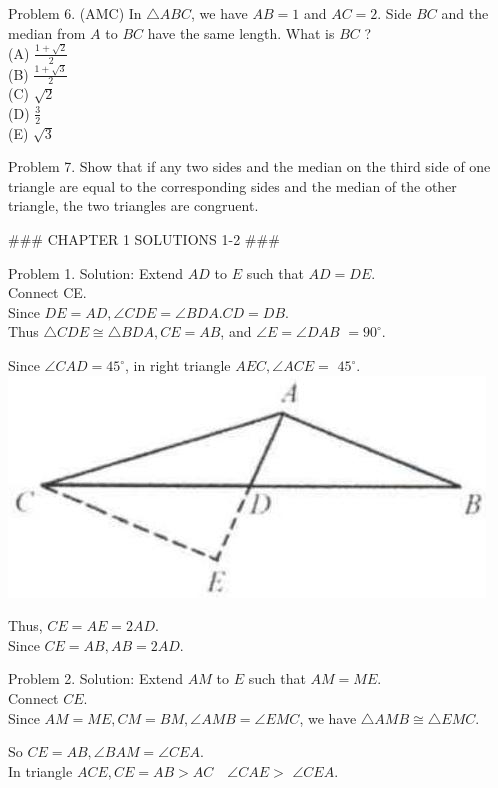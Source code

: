 \documentclass[10pt]{article}
\begin{document}
Problem 6. (AMC) In \(\triangle A B C\), we have \(A B=1\) and \(A C=2\). Side \(B C\) and the median from \(A\) to \(B C\) have the same length. What is \(B C\) ?\\
(A) \(\frac{1+\sqrt{2}}{2}\)\\
(B) \(\frac{1+\sqrt{3}}{2}\)\\
(C) \(\sqrt{2}\)\\
(D) \(\frac{3}{2}\)\\
(E) \(\sqrt{3}\)

Problem 7. Show that if any two sides and the median on the third side of one triangle are equal to the corresponding sides and the median of the other triangle, the two triangles are congruent.


### CHAPTER 1 SOLUTIONS 1-2 ###

Problem 1. Solution:
Extend \(A D\) to \(E\) such that \(A D=D E\).\\
Connect CE.\\
Since \(D E=A D, \angle C D E=\angle B D A . C D=D B\).\\
Thus \(\triangle C D E \cong \triangle B D A, C E=A B\), and \(\angle E=\angle D A B\) \(=90^{\circ}\).

Since \(\angle C A D=45^{\circ}\), in right triangle \(A E C, \angle A C E=\) \(45^{\circ}\).\\
\includegraphics[max width=\textwidth, center]{2025_04_17_97bc1f7e44d93c271a88g-029}

Thus, \(C E=A E=2 A D\).\\
Since \(C E=A B, A B=2 A D\).

Problem 2. Solution:
Extend \(A M\) to \(E\) such that \(A M=M E\).\\
Connect \(C E\).\\
Since \(A M=M E, C M=B M, \angle A M B=\angle E M C\), we have \(\triangle A M B \cong \triangle E M C\).

So \(C E=A B, \angle B A M=\angle C E A\).\\
In triangle \(A C E, C E=A B>A C \quad \angle C A E>\) \(\angle C E A\).
\end{document}

